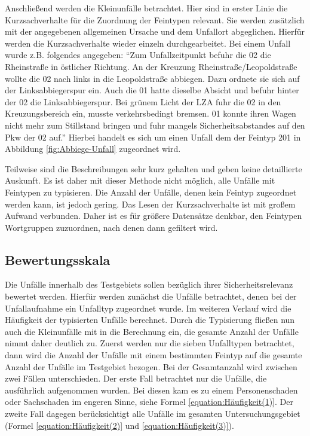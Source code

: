 Anschließend werden die Kleinunfälle betrachtet. Hier sind in erster Linie die Kurzsachverhalte für die Zuordnung der Feintypen relevant. Sie werden zusätzlich mit der angegebenen allgemeinen Ursache und dem Unfallort abgeglichen. Hierfür werden die Kurzsachverhalte wieder einzeln durchgearbeitet. Bei einem Unfall wurde z.B. folgendes angegeben: \enquote{Zum Unfallzeitpunkt befuhr die 02 die Rheinstraße in östlicher Richtung. An der Kreuzung Rheinstraße/Leopoldstraße wollte die 02 nach links in die Leopoldstraße abbiegen. Dazu ordnete sie sich auf der Linksabbiegerspur ein. Auch die 01 hatte dieselbe Absicht und befuhr hinter der 02 die Linksabbiegerspur. Bei grünem Licht der LZA fuhr die 02 in den Kreuzungsbereich ein, musste verkehrsbedingt bremsen. 01 konnte ihren Wagen nicht mehr zum Stillstand bringen und fuhr mangels Sicherheitsabstandes auf den Pkw der 02 auf.} Hierbei handelt es sich um einen Unfall dem der Feintyp 201 in Abbildung \ref{fig:Abbiege-Unfall} zugeordnet wird.

Teilweise sind die Beschreibungen sehr kurz gehalten und geben keine detaillierte Auskunft. Es ist daher mit dieser Methode nicht möglich, alle Unfälle mit Feintypen zu typisieren. Die Anzahl der Unfälle, denen kein Feintyp zugeordnet werden kann, ist jedoch gering. Das Lesen der Kurzsachverhalte ist mit großem Aufwand verbunden. Daher ist es für größere Datensätze denkbar, den Feintypen Wortgruppen zuzuordnen, nach denen dann gefiltert wird. %

\subsection{Bewertungsskala}\label{subsection:Bewertungsskala}
Die Unfälle innerhalb des Testgebiets sollen bezüglich ihrer Sicherheitsrelevanz bewertet werden. Hierfür werden zunächst die Unfälle betrachtet, denen bei der Unfallaufnahme ein Unfalltyp zugeordnet wurde. Im weiteren Verlauf wird die Häufigkeit der typisierten Unfälle berechnet. Durch die Typisierung fließen nun auch die Kleinunfälle mit in die Berechnung ein, die gesamte Anzahl der Unfälle nimmt daher deutlich zu. Zuerst werden nur die sieben Unfalltypen betrachtet, dann wird die Anzahl der Unfälle mit einem bestimmten Feintyp auf die gesamte Anzahl der Unfälle im Testgebiet bezogen. Bei der Gesamtanzahl wird zwischen zwei Fällen unterschieden. Der erste Fall betrachtet nur die Unfälle, die ausführlich aufgenommen wurden. Bei diesen kam es zu einem Personenschaden oder Sachschaden im engeren Sinne, siehe Formel \ref{equation:Häufigkeit(1)}. Der zweite Fall dagegen berücksichtigt alle Unfälle im gesamten Untersuchungsgebiet (Formel \ref{equation:Häufigkeit(2)} und \ref{equation:Häufigkeit(3)}).

